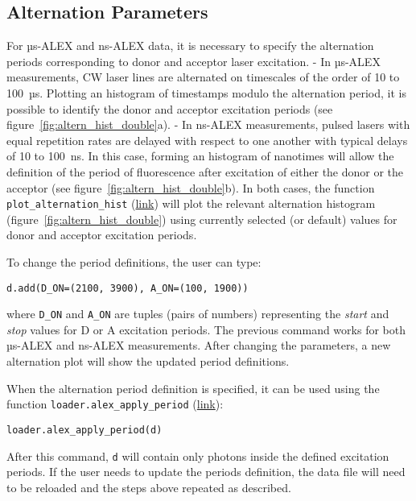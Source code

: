 \subsection{Alternation Parameters}
\label{sec:alternation}

For µs-ALEX and ns-ALEX data, it is necessary to specify the
alternation periods corresponding to donor and acceptor laser excitation.
- In µs-ALEX measurements,
CW laser lines are alternated on timescales of the order of 10 to 100~µs.
Plotting an histogram of timestamps modulo the alternation period, it
is possible to identify the donor and acceptor excitation periods (see figure~\ref{fig:altern_hist_double}a).
- In ns-ALEX measurements,
 pulsed lasers with equal repetition rates are delayed with respect to one another with typical delays of 10 to 100~ns.
In this case, forming an histogram of nanotimes
will allow 
the definition of the period of fluorescence after excitation of either the donor or the acceptor
(see figure~\ref{fig:altern_hist_double}b).
In both cases, the function
\verb|plot_alternation_hist| 
(\href{http://fretbursts.readthedocs.org/en/latest/plots.html#fretbursts.burst_plot.plot_alternation_hist}{link})
will plot the relevant alternation histogram (figure~\ref{fig:altern_hist_double}) 
using currently selected (or default) values for donor and acceptor excitation periods.

To change the period definitions, the user can type:

\begin{lstlisting}
d.add(D_ON=(2100, 3900), A_ON=(100, 1900))
\end{lstlisting}

where \verb|D_ON| and \verb|A_ON| are tuples (pairs of numbers) representing
the \textit{start} and \textit{stop} values for D or A excitation periods.
The previous command works for both µs-ALEX and ns-ALEX measurements.
After changing the parameters, a new alternation plot will show the updated 
period definitions.

When the alternation period definition is specified, it can
be used using the function \verb|loader.alex_apply_period|
(\href{http://fretbursts.readthedocs.org/en/latest/loader.html#fretbursts.loader.alex_apply_period}{link}):

\begin{lstlisting}
loader.alex_apply_period(d)
\end{lstlisting}

After this command, \verb|d| will contain only photons inside the defined excitation periods.
If the user needs to update the periods definition, the data file will need to be reloaded and the steps above repeated as described.
